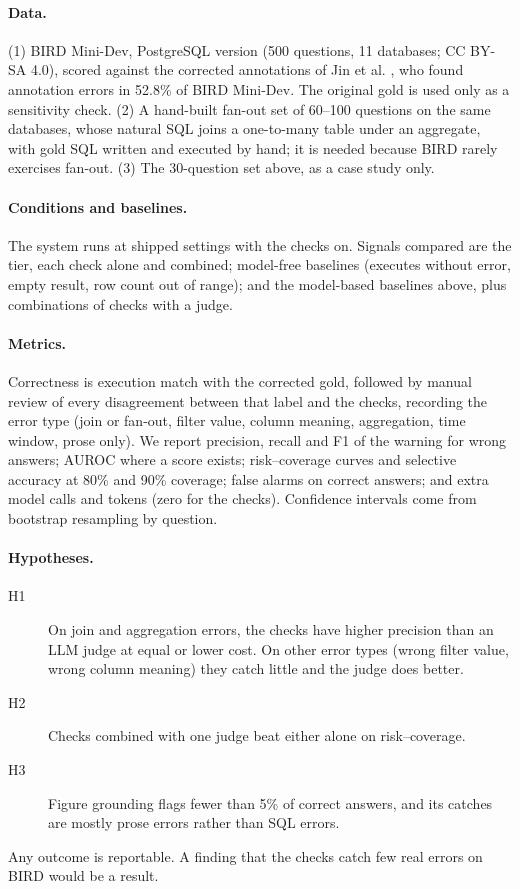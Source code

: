 \documentclass[10pt,twocolumn]{article}
\begin{document}
\paragraph{Data.} (1) BIRD Mini-Dev, PostgreSQL version (500 questions, 11 databases; CC BY-SA 4.0), scored against the corrected annotations of Jin et al. \cite{jin2026}, who found annotation errors in 52.8\% of BIRD Mini-Dev. The original gold is used only as a sensitivity check. (2) A hand-built fan-out set of 60--100 questions on the same databases, whose natural SQL joins a one-to-many table under an aggregate, with gold SQL written and executed by hand; it is needed because BIRD rarely exercises fan-out. (3) The 30-question set above, as a case study only.

\paragraph{Conditions and baselines.} The system runs at shipped settings with the checks on. Signals compared are the tier, each check alone and combined; model-free baselines (executes without error, empty result, row count out of range); and the model-based baselines above, plus combinations of checks with a judge.

\paragraph{Metrics.} Correctness is execution match with the corrected gold, followed by manual review of every disagreement between that label and the checks, recording the error type (join or fan-out, filter value, column meaning, aggregation, time window, prose only). We report precision, recall and F1 of the warning for wrong answers; AUROC where a score exists; risk--coverage curves and selective accuracy at 80\% and 90\% coverage; false alarms on correct answers; and extra model calls and tokens (zero for the checks). Confidence intervals come from bootstrap resampling by question.

\paragraph{Hypotheses.}
\begin{description}
\item[H1] On join and aggregation errors, the checks have higher precision than an LLM judge at equal or lower cost. On other error types (wrong filter value, wrong column meaning) they catch little and the judge does better.
\item[H2] Checks combined with one judge beat either alone on risk--coverage.
\item[H3] Figure grounding flags fewer than 5\% of correct answers, and its catches are mostly prose errors rather than SQL errors.
\end{description}
Any outcome is reportable. A finding that the checks catch few real errors on BIRD would be a result.
\end{document}
